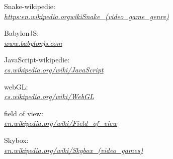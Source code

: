 \documentclass[a4paper,titlepage]{article}
\begin{document}
		
	\begin{thebibliography}{99}
			Snake-wikipedie:\\
			\textit{\href{https://en.wikipedia.org/wiki/Snake_(video_game_genre)}
				{https:\/\/en.wikipedia.org\/wiki\/Snake\_(video\_game\_genre)}}
		
			BabylonJS:\\
			\textit{\href{https://www.babylonjs.com/}
				{www.babylonjs.com}}
			
			
			JavaScript-wikipedie:\\
			\textit{\href{https://cs.wikipedia.org/wiki/JavaScript}
				{cs.wikipedia.org/wiki/JavaScript}}
				
			webGL:\\
			\textit{\href{https://cs.wikipedia.org/wiki/WebGL}
				{cs.wikipedia.org/wiki/WebGL}}
				
			field of view:\\
			\textit{\href{https://en.wikipedia.org/wiki/Field_of_view}
				{en.wikipedia.org/wiki/Field\_of\_view}}
				
			Skybox:\\
			\textit{\href{https://en.wikipedia.org/wiki/Skybox_(video_games)}
				{en.wikipedia.org/wiki/Skybox\_(video\_games)}}
				
	\end{thebibliography}
		
\end{document}
